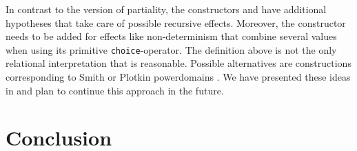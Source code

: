 In contrast to the version of partiality, the constructors  and  have additional hypotheses that take care of possible recursive effects.
Moreover, the constructor  needs to be added for effects like non-determinism that combine several values when using its primitive \texttt{choice}-operator.
The definition above is not the only relational interpretation that is reasonable.
Possible alternatives are constructions corresponding to Smith or Plotkin powerdomains \citep{abramsky1994domain}.
We have presented these ideas in \citet{christiansen2019proving} and plan to continue this approach in the future.

\section{Conclusion}
\label{sec:conclusion}

